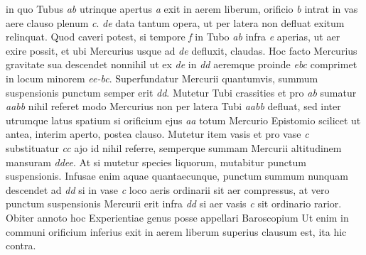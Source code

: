                      in quo Tubus \textit{ab} utrinque apertus  \textit{a} exit in aerem liberum, orificio \textit{b} intrat in vas aere clauso plenum \textit{c}.  \textit{de} data tantum opera, ut per latera non defluat  exitum relinquat. Quod caveri potest, si tempore  \textit{f} in Tubo \textit{ab} infra \textit{e} aperias, ut aer exire possit, et ubi Mercurius\protect{} usque ad \textit{de} defluxit, claudas. Hoc facto Mercurius\protect{} gravitate\protect{} sua descendet nonnihil ut ex \textit{de} in \textit{dd} aeremque proinde \textit{ebc} comprimet in locum minorem \textit{ee-bc}. Superfundatur Mercurii\protect{} quantumvis, summum suspensionis punctum semper erit \textit{dd}. Mutetur Tubi crassities et pro \textit{ab} sumatur \textit{aabb} nihil referet modo Mercurius\protect{} non per latera Tubi \textit{aabb} defluat, sed inter utrumque latus spatium  si orificium ejus \textit{aa} totum Mercurio\protect{}  Epistomio\protect{} scilicet ut antea, interim aperto, postea clauso. Mutetur item  vasis et pro vase \textit{c} substituatur \textit{cc} ajo id nihil referre, semperque summam Mercurii\protect{} altitudinem mansuram \textit{ddee}. At si mutetur species liquorum\protect{}, mutabitur punctum suspensionis. Infusae enim aquae quantaecunque, punctum summum nunquam descendet ad \textit{dd}  si in vase \textit{c} loco aeris ordinarii sit aer  compressus, at vero punctum suspensionis Mercurii\protect{} erit infra \textit{dd} si aer vasis \textit{c} sit ordinario rarior. Obiter annoto hoc Experientiae genus posse appellari Baroscopium\protect{}   Ut enim in communi orificium inferius exit in aerem liberum superius clausum est, ita hic contra. 